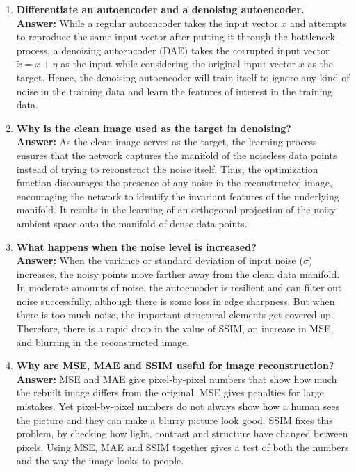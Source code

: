 \documentclass[10pt]{article}
\begin{document}
\begin{enumerate}
\vspace{5mm}

\item \textbf{Differentiate an autoencoder and a denoising autoencoder.}\\[1.5mm]
\textbf{Answer:} While a regular autoencoder takes the input vector \(x\) and attempts to reproduce the same input vector after putting it through the bottleneck process, a denoising autoencoder (DAE) takes the corrupted input vector \(\tilde{x} = x + \eta\) as the input while considering the original input vector \(x\) as the target. Hence, the denoising autoencoder will train itself to ignore any kind of noise in the training data and learn the features of interest in the training data.
\vspace{5mm}

\item \textbf{Why is the clean image used as the target in denoising?}\\[1.5mm]
\textbf{Answer:} As the clean image serves as the target, the learning process ensures that the network captures the manifold of the noiseless data points instead of trying to reconstruct the noise itself. Thus, the optimization function discourages the presence of any noise in the reconstructed image, encouraging the network to identify the invariant features of the underlying manifold. It results in the learning of an orthogonal projection of the noisy ambient space onto the manifold of dense data points.

\vspace{5mm}

\item \textbf{What happens when the noise level is increased?}\\[1.5mm]
\textbf{Answer:} When the variance or standard deviation of input noise ($\sigma$) increases, the noisy points move farther away from the clean data manifold. In moderate amounts of noise, the autoencoder is resilient and can filter out noise successfully, although there is some loss in edge sharpness. But when there is too much noise, the important structural elements get covered up. Therefore, there is a rapid drop in the value of SSIM, an increase in MSE, and blurring in the reconstructed image.

\vspace{5mm}

\item \textbf{Why are MSE, MAE and SSIM useful for image reconstruction?}\\[1.5mm]
\textbf{Answer:}  MSE and MAE give pixel‑by‑pixel numbers that show how much the rebuilt image differs from the original. MSE gives penalties for large mistakes. Yet pixel‑by‑pixel numbers do not always show how a human sees the picture and they can make a blurry picture look good. SSIM fixes this problem, by checking how light, contrast and structure have changed between pixels. Using MSE, MAE and SSIM together gives a test of both the numbers and the way the image looks to people.


\end{enumerate}
\end{document}
